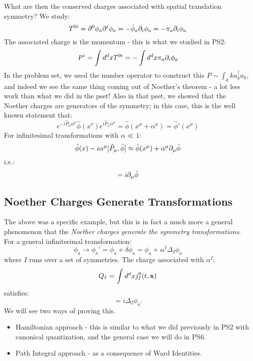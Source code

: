 What are then the conserved charges associated with spatial translation symmetry? We study:
\begin{equation}
    T^{0i} = \partial^0 \phi_a \partial^i \phi_a = -\dot{\phi}_a \partial_i \phi_a = -\pi_a \partial_i \phi_a
\end{equation}
The associated charge is the momentum - this is what we studied in PS2:
\begin{equation}
    P^i = \int d^dx T^{0i} = -\int d^dx \pi_a \partial_i \phi_a
\end{equation}
In the problem set, we used the number operator to construct this $P \sim \int_k k a_k^\dag a_k$, and indeed we see the same thing coming out of Noether's theorem - a lot less work than what we did in the pset! Also in that pset, we showed that the Noether charges are generators of the symmetry; in this case, this is the well known statement that:
\begin{equation}
    e^{-i\hat{P}_\mu \alpha^\mu}\hat{\phi}(x^\nu) e^{i\hat{P}_\mu\alpha^\mu} = \hat{\phi}(x^\mu + \alpha^\mu) = \hat{\phi}'(x^\mu)
\end{equation}
For infinitesimal transformations with $\alpha \ll 1$:
\begin{equation}
    \hat{\phi}(x) - i\alpha^\mu[\hat{P}_\mu, \hat{\phi}] \approx \hat{\phi}(x^\mu) + \alpha^\mu \partial_\mu \hat{\phi}
\end{equation}
i.e.:
\begin{equation}
    [\hat{P}_\mu, \hat{\phi}(x)] = i\p_\mu \hat{\phi}
\end{equation}

\subsection{Noether Charges Generate Transformations}
The above was a specific example, but this is in fact a much more a general phenomenon that the \emph{Noether charges generate the symmetry transformations}. For a general infinitesimal transformation:
\begin{equation}
    \phi_a \to \phi_a' = \phi_a + \delta \phi_a = \phi_a + \alpha^I\Delta_I \phi_a
\end{equation}
where $I$ runs over a set of symmetries. The charge associated with $\alpha^I$:
\begin{equation}
    Q_I = \int d^d x j_I^0(t, \mathbf{x})
\end{equation}
satisfies:
\begin{equation}
    [Q_I, \phi_a] = i\Delta_I \phi_a.
\end{equation}
We will see two ways of proving this.
\begin{itemize}
    \item Hamiltonian approach - this is similar to what we did previously in PS2 with canonical quantization, and the general case we will do in PS6.
    \item Path Integral approach - as a consequence of Ward Identities.
\end{itemize}

